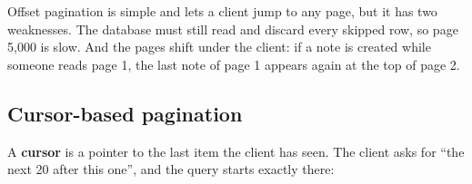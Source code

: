 \noindent{}Offset pagination is simple and lets a client jump to any page, but it has two weaknesses. The database must still read and discard every skipped row, so page 5,000 is slow. And the pages shift under the client: if a note is created while someone reads page 1, the last note of page 1 appears again at the top of page 2.

\subsection*{Cursor-based pagination}\label{34-response-handling:cursor-based-pagination}

A \textbf{cursor} is a pointer to the last item the client has seen. The client asks for ``the next 20 after this one'', and the query starts exactly there:

